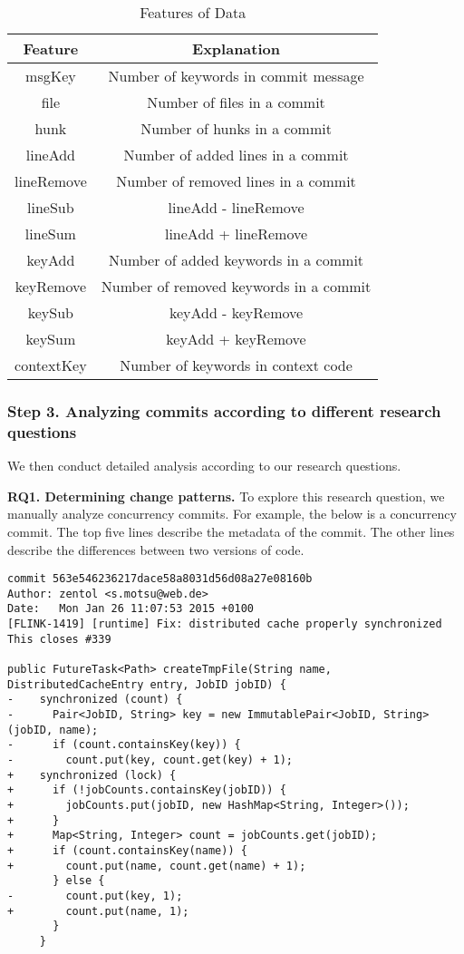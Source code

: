 \begin{table}
	\centering
	\caption{Features of Data}
\label{table:feature}
	\begin{tabular}{|c|c|}\hline
		Feature&Explanation\\\hline
		msgKey&Number of keywords in commit message\\
		file&Number of files in a commit\\
		hunk&Number of hunks in a commit\\
		lineAdd&Number of added lines in a commit\\
		lineRemove&Number of removed lines in a commit\\
		lineSub&lineAdd - lineRemove\\
		lineSum&lineAdd + lineRemove\\
		keyAdd&Number of added keywords in a commit\\
		keyRemove&Number of removed keywords in a commit\\
		keySub&keyAdd - keyRemove\\
		keySum&keyAdd + keyRemove\\
		contextKey&Number of keywords in context code\\\hline
	\end{tabular}
\end{table}

\subsubsection{Step 3. Analyzing commits according to different research questions} We then conduct detailed analysis according to our research questions.



\textbf{RQ1. Determining change patterns.} To explore this research question, we manually analyze concurrency commits. For example, the below is a concurrency commit. The top five lines describe the metadata of the commit. The other lines describe the differences between two versions of code.

\begin{lstlisting}
commit 563e546236217dace58a8031d56d08a27e08160b
Author: zentol <s.motsu@web.de>
Date:   Mon Jan 26 11:07:53 2015 +0100
[FLINK-1419] [runtime] Fix: distributed cache properly synchronized
This closes #339

public FutureTask<Path> createTmpFile(String name, DistributedCacheEntry entry, JobID jobID) {
-    synchronized (count) {
-      Pair<JobID, String> key = new ImmutablePair<JobID, String>(jobID, name);
-      if (count.containsKey(key)) {
-        count.put(key, count.get(key) + 1);
+    synchronized (lock) {
+      if (!jobCounts.containsKey(jobID)) {
+        jobCounts.put(jobID, new HashMap<String, Integer>());
+      }
+      Map<String, Integer> count = jobCounts.get(jobID);
+      if (count.containsKey(name)) {
+        count.put(name, count.get(name) + 1);
       } else {
-        count.put(key, 1);
+        count.put(name, 1);
       }
     }
\end{lstlisting}

